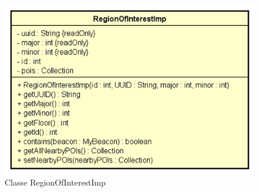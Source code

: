 \documentclass[../DefinizioneDiProdotto.tex]{subfiles}
\begin{document}
    \begin{figure}[H]
        \centering
        \includegraphics{img/RegionOfInterestImp.png}
        \caption{Classe RegionOfInterestImp}\label{fig:model::navigator::graph::area::RegionOfInterestImp} 
    \end{figure}
\end{document}
